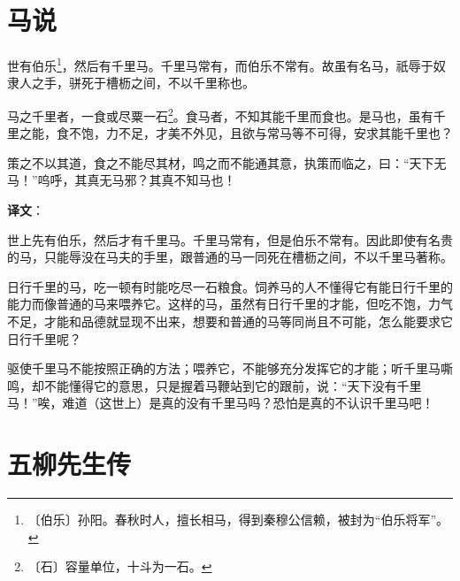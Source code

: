 \documentclass[12pt,UTF-8,openany,a4]{ctexbook}
\begin{document}
\chapter{马说}

\begin{large}
    
    世有伯乐\footnote{〔伯乐〕\yiwen 孙阳。春秋时人，擅长相马，得到秦穆公信赖，被封为“伯乐将军”。}，然后有千里马。千里马常有，而伯乐不常有。故虽有名马，祇辱于奴隶人之手，骈死于槽枥之间，不以千里称也。
    
    马之千里者，一食或尽粟一石\footnote{〔石〕\yiwen 容量单位，十斗为一石。}。食马者，不知其能千里而食也。是马也，虽有千里之能，食不饱，力不足，才美不外见，且欲与常马等不可得，安求其能千里也？
    
    策之不以其道，食之不能尽其材，鸣之而不能通其意，执策而临之，曰：“天下无马！”呜呼，其真无马邪？其真不知马也！

\end{large}


\newpage

\begin{Large}
   \noindent \textbf{译文}：
\end{Large}

\vspace{1em}

\begin{large}\yiwen
    
    世上先有伯乐，然后才有千里马。千里马常有，但是伯乐不常有。因此即使有名贵的马，只能辱没在马夫的手里，跟普通的马一同死在槽枥之间，不以千里马著称。
    
    日行千里的马，吃一顿有时能吃尽一石粮食。饲养马的人不懂得它有能日行千里的能力而像普通的马来喂养它。这样的马，虽然有日行千里的才能，但吃不饱，力气不足，才能和品德就显现不出来，想要和普通的马等同尚且不可能，怎么能要求它日行千里呢？
    
    驱使千里马不能按照正确的方法；喂养它，不能够充分发挥它的才能；听千里马嘶鸣，却不能懂得它的意思，只是握着马鞭站到它的跟前，说：“天下没有千里马！”唉，难道（这世上）是真的没有千里马吗？恐怕是真的不认识千里马吧！
    

\end{large}



\chapter{五柳先生传}
\end{document}
